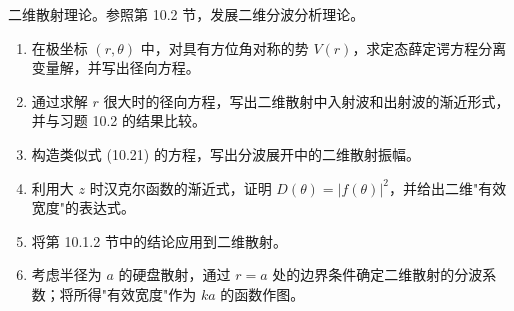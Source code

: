 \begin{question}
二维散射理论。参照第 10.2 节，发展二维分波分析理论。
\begin{enumerate}
\item 在极坐标 $(r,\theta)$ 中，对具有方位角对称的势 $V(r)$，求定态薛定谔方程分离变量解，并写出径向方程。
\item 通过求解 $r$ 很大时的径向方程，写出二维散射中入射波和出射波的渐近形式，并与习题 10.2 的结果比较。
\item 构造类似式 (10.21) 的方程，写出分波展开中的二维散射振幅。
\item 利用大 $z$ 时汉克尔函数的渐近式，证明 $D(\theta)=|f(\theta)|^2$，并给出二维"有效宽度"的表达式。
\item 将第 10.1.2 节中的结论应用到二维散射。
\item 考虑半径为 $a$ 的硬盘散射，通过 $r=a$ 处的边界条件确定二维散射的分波系数；将所得"有效宽度"作为 $ka$ 的函数作图。
\end{enumerate}

\par\smallskip
{}

\end{question}
